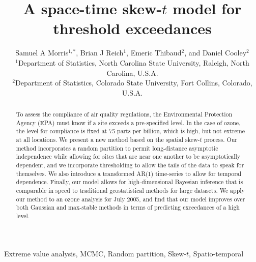 \documentclass[useAMS,usenatbib,referee]{biom}
\title[A Space-time Skew-$t$ Model for Threshold Exceedances]{A space-time skew-$t$ model for threshold exceedances}
\author
{Samuel A Morris$^{1,*}$\email{samorris@ncsu.edu},
Brian J Reich$^{1}$,
Emeric Thibaud$^{2}$, and
Daniel Cooley$^{2}$\\
$^{1}$Department of Statistics, North Carolina State University, Raleigh, North Carolina, U.S.A. \\
$^{2}$Department of Statistics, Colorado State University, Fort Collins, Colorado, U.S.A.}
\begin{document}



\pagerange{\pageref{stfirstpage}--\pageref{stlastpage}}

\label{stfirstpage}

\begin{abstract}
To assess the compliance of air quality regulations, the Environmental Protection Agency (EPA) must know if a site exceeds a pre-specified level.
In the case of ozone, the level for compliance is fixed at 75 parts per billion, which is high, but not extreme at all locations.
We present a new method based on the spatial skew-$t$ process.
Our method incorporates a random partition to permit long-distance asymptotic independence while allowing for sites that are near one another to be asymptotically dependent, and we incorporate thresholding to allow the tails of the data to speak for themselves.
We also introduce a transformed AR(1) time-series to allow for temporal dependence.
Finally, our model allows for high-dimensional Bayesian inference that is comparable in speed to traditional geostatistical methods for large datasets.
We apply our method to an ozone analysis for July 2005, and find that our model improves over both Gaussian and max-stable methods in terms of predicting exceedances of a high level.
\end{abstract}

\begin{keywords}
Extreme value analysis, MCMC, Random partition, Skew-$t$, Spatio-temporal
\end{keywords}

\maketitle
\end{document}
